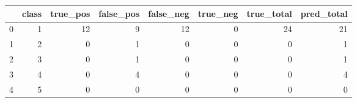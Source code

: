\begin{tabular}{lrrrrrrr}
\toprule
 & class & true_pos & false_pos & false_neg & true_neg & true_total & pred_total \\
\midrule
0 & 1 & 12 & 9 & 12 & 0 & 24 & 21 \\
1 & 2 & 0 & 1 & 0 & 0 & 0 & 1 \\
2 & 3 & 0 & 1 & 0 & 0 & 0 & 1 \\
3 & 4 & 0 & 4 & 0 & 0 & 0 & 4 \\
4 & 5 & 0 & 0 & 0 & 0 & 0 & 0 \\
\bottomrule
\end{tabular}
